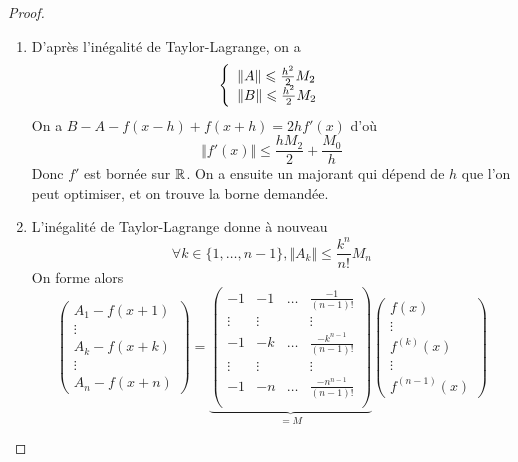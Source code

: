 \documentclass[12pt]{article}
\begin{document}
\begin{proof}
	\phantom{}
	\begin{enumerate}
		\item D'après l'inégalité de Taylor-Lagrange, on a 
		\begin{equation}
		\left\{
			\begin{array}[]{l}
				\Vert A\Vert\leqslant\frac{h^{2}}{2}M_{2}\\
				\Vert B\Vert\leqslant\frac{h^{2}}{2}M_{2}
			\end{array}
		\right.
		\end{equation}
		On a $B-A-f(x-h)+f(x+h)=2hf'(x)$ d'où 
		\begin{equation}\Vert f'(x)\Vert\leqslant\frac{hM_{2}}{2}+\frac{M_{0}}{h}\end{equation}
		Donc $f'$ est bornée sur $\mathbb{R}$. On a ensuite un majorant qui dépend de $h$ que l'on peut optimiser, et on trouve la borne demandée.

		\item L'inégalité de Taylor-Lagrange donne à nouveau
		\begin{equation}\forall k\in\{1,\dots,n-1\},\Vert A_{k}\Vert\leqslant\frac{k^{n}}{n!}M_{n}\end{equation}
		On forme alors
		\begin{equation}
		\begin{pmatrix}
			A_{1}-f(x+1)\\
			\vdots\\
			A_{k}-f(x+k)\\
			\vdots\\
			A_{n}-f(x+n)
		\end{pmatrix}
		=
		\underbrace{
		\begin{pmatrix}
			-1 & -1 & \dots & \frac{-1}{(n-1)!}\\
			\vdots & \vdots & & \vdots\\
			-1 & -k & \dots & \frac{-k^{n-1}}{(n-1)!}\\
			\vdots & \vdots & & \vdots\\
			-1 & -n & \dots & \frac{-n^{n-1}}{(n-1)!}\\
		\end{pmatrix}}_{=M}
		\begin{pmatrix}
			f(x)\\
			\vdots\\
			f^{(k)}(x)\\
			\vdots\\
			f^{(n-1)}(x)
		\end{pmatrix}
		\end{equation}


\end{enumerate}
\end{proof}
\end{document}
